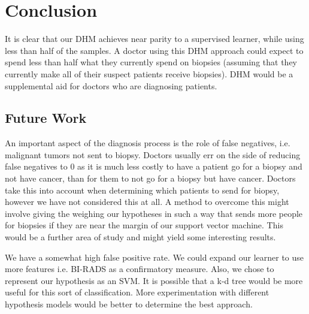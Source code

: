 \documentclass[12pt]{article}
\begin{document}
\section{Conclusion}

It is clear that our DHM achieves near parity to a supervised learner, while using less than half of the samples. A doctor using this DHM approach could expect to spend less than half what they currently spend on biopsies (assuming that they currently make all of their suspect patients receive biopsies). DHM would be a supplemental aid for doctors who are diagnosing patients. 

\subsection{Future Work}
An important aspect of the diagnosis process is the role of false negatives, i.e. malignant tumors not sent to biopsy. Doctors usually err on the side of reducing false negatives to 0 as it is much less costly to have a patient go for a biopsy and not have cancer, than for them to not go for a biopsy but have cancer. Doctors take this into account when determining which patients to send for biopsy, however we have not considered this at all. A method to overcome this might involve giving the weighing our hypotheses in such a way that sends more people for biopsies if they are near the margin of our support vector machine. This would be a further area of study and might yield some interesting results.

We have a somewhat high false positive rate. We could expand our learner to use more features i.e. BI-RADS as a confirmatory measure. Also, we chose to represent our hypothesis as an SVM. It is possible that a k-d tree would be more useful for this sort of classification. More experimentation with different hypothesis models would be better to determine the best approach.

{}

\end{document}
